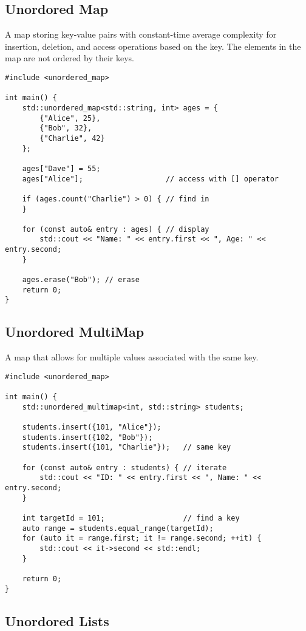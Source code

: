 \subsection{Unordored Map}

A map storing key-value pairs with constant-time average complexity for insertion,
deletion, and access operations based on the key.
The elements in the map are not ordered by their keys.

\begin{verbatim}
#include <unordered_map>

int main() {
    std::unordered_map<std::string, int> ages = {
        {"Alice", 25},
        {"Bob", 32},
        {"Charlie", 42}
    };

    ages["Dave"] = 55;
    ages["Alice"];                   // access with [] operator

    if (ages.count("Charlie") > 0) { // find in
    }

    for (const auto& entry : ages) { // display
        std::cout << "Name: " << entry.first << ", Age: " << entry.second;
    }

    ages.erase("Bob"); // erase
    return 0;
}
\end{verbatim}

\subsection{Unordored MultiMap}

A map that allows for multiple values associated with the same key. 

\begin{verbatim}
#include <unordered_map>

int main() {
    std::unordered_multimap<int, std::string> students;

    students.insert({101, "Alice"});
    students.insert({102, "Bob"});
    students.insert({101, "Charlie"});   // same key

    for (const auto& entry : students) { // iterate 
        std::cout << "ID: " << entry.first << ", Name: " << entry.second;
    }

    int targetId = 101;                  // find a key
    auto range = students.equal_range(targetId);
    for (auto it = range.first; it != range.second; ++it) { 
        std::cout << it->second << std::endl;
    }

    return 0;
}
\end{verbatim}

\subsection{Unordored Lists}


